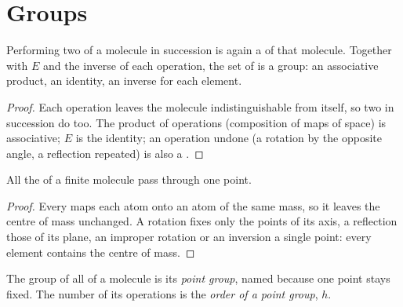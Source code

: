\section{Groups}

\begin{proposition}\label{prop:b3:point-groups:closure}
Performing two  of a molecule in succession is again a
 of that molecule. Together with $E$ and the inverse of
each operation, the set of  is a group: an associative
product, an identity, an inverse for each element.
\end{proposition}

\begin{proof}
Each operation leaves the molecule indistinguishable from itself, so two in
succession do too. The product of operations (composition of maps of space)
is associative; $E$ is the identity; an operation undone (a rotation by the
opposite angle, a reflection repeated) is also a .
\end{proof}

\begin{proposition}\label{prop:b3:point-groups:fixed-point}
All the  of a finite molecule pass through one point.
\end{proposition}

\begin{proof}
Every  maps each atom onto an atom of the same mass, so it
leaves the centre of mass unchanged. A rotation fixes only the points of its
axis, a reflection those of its plane, an improper rotation or an inversion
a single point: every element contains the centre of mass.
\end{proof}

\begin{definition}\label{def:b3:point-groups:point-group}
The group of all  of a molecule is its \emph{point
group}, named because one point stays fixed. The number of
its operations is the \emph{order of a point group},
$h$.
\end{definition}

